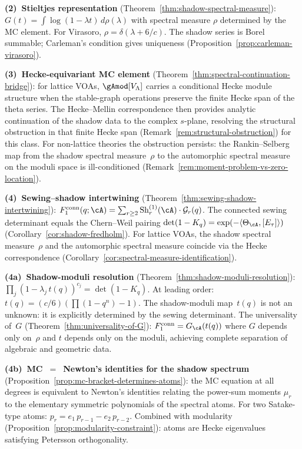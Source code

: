 \smallskip\noindent
\textbf{(2)~Stieltjes representation}
(Theorem~\ref{thm:shadow-spectral-measure}):
$G(t) = \int\!\log(1{-}\lambda t)\,d\rho(\lambda)$
with spectral measure $\rho$ determined by the MC element.
For Virasoro, $\rho = \delta(\lambda{+}6/c)$.
The shadow series is Borel summable; Carleman's condition
gives uniqueness (Proposition~\ref{prop:carleman-virasoro}).

\smallskip\noindent
\textbf{(3)~Hecke-equivariant MC element}
(Theorem~\ref{thm:spectral-continuation-bridge}):
for lattice VOAs, $\gAmod[V_\Lambda]$ carries a conditional Hecke
module structure when the stable-graph operations preserve the finite
Hecke span of the theta series. The Hecke--Mellin correspondence then
provides analytic continuation of the shadow data to the complex
$s$-plane, resolving the structural obstruction in that finite Hecke
span
(Remark~\ref{rem:structural-obstruction}) for this class.
For non-lattice theories the obstruction persists:
the Rankin--Selberg map from the shadow spectral measure~$\rho$
to the automorphic spectral measure on the moduli space is
ill-conditioned (Remark~\ref{rem:moment-problem-vs-zero-location}).

\smallskip\noindent
\textbf{(4)~Sewing--shadow intertwining}
(Theorem~\ref{thm:sewing-shadow-intertwining}):
$F_1^{\mathrm{conn}}(q;\cA) = \sum_{r\ge2}
\operatorname{Sh}_r^{(1)}(\cA) \cdot \mathcal{G}_r(q)$.
The connected sewing determinant equals the Chern--Weil pairing
$\det(1-K_q) = \exp(-\langle\Theta_\cA,[E_\tau]\rangle)$
(Corollary~\ref{cor:shadow-fredholm}).
For lattice VOAs, the shadow spectral measure~$\rho$
and the automorphic spectral measure coincide via the
Hecke correspondence
(Corollary~\ref{cor:spectral-measure-identification}).

\smallskip\noindent
\textbf{(4a)~Shadow-moduli resolution}
(Theorem~\ref{thm:shadow-moduli-resolution}):
$\prod_j(1-\lambda_j\,t(q))^{c_j} = \det(1-K_q)$.
At leading order: $t(q) = (c/6)(\prod(1{-}q^n)-1)$.
The shadow-moduli map~$t(q)$ is not an unknown: it is
explicitly determined by the sewing determinant.
The universality of~$G$
(Theorem~\ref{thm:universality-of-G}):
$F_1^{\mathrm{conn}} = G_\cA(t(q))$ where
$G$ depends only on~$\rho$ and $t$ depends only on
the moduli, achieving complete separation of algebraic and
geometric data.

\smallskip\noindent
\textbf{(4b)~MC~$=$~Newton's identities for the shadow spectrum}
(Proposition~\ref{prop:mc-bracket-determines-atoms}):
the MC equation at all degrees is equivalent to Newton's
identities relating the power-sum moments $\mu_r$ to the
elementary symmetric polynomials of the spectral atoms.
For two Satake-type atoms:
$p_r = e_1\,p_{r-1} - e_2\,p_{r-2}$.
Combined with modularity
(Proposition~\ref{prop:modularity-constraint}): atoms are
Hecke eigenvalues satisfying Petersson orthogonality.

